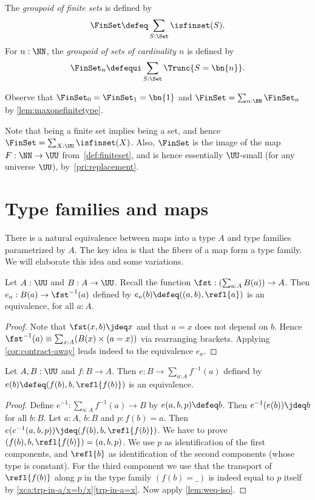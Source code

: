 \begin{definition}\label{def:groupoidFin}
The \emph{groupoid of finite sets} is defined by
\[
  \FinSet\defeq\sum_{S:\Set}\isfinset(S).
\]
For $n:\NN$, the \emph{groupoid of sets of cardinality $n$} is defined by
\[
  \FinSet_n\defequi \sum_{S:\Set}\Trunc{S=\bn{n}}.\qedhere
\]
\end{definition}
Observe that $\FinSet_0=\FinSet_1=\bn{1} $ and $\FinSet=\sum_{n:\NN}\FinSet_n$
by \cref{lem:maxonefinitetype}.

Note that being a finite set implies being a set, and hence
$\FinSet = \sum_{X:\UU}\isfinset(X)$.
Also, $\FinSet$ is the image of the map $F : \NN \to \UU$
from~\cref{def:finiteset}, and is hence essentially $\UU$-small
(for any universe $\UU$), by~\cref{pri:replacement}.


\section{Type families and maps}
\label{sec:typefam}

There is a natural equivalence between maps into a type $A$
and type families parametrized by $A$. The key idea is that the
fibers of a map form a type family. We will elaborate this
idea and some variations.


\begin{lemma}\label{lem:fst-fiber(a)=B(a)}
Let $A:\UU$ and $B:A\to\UU$.
Recall the function $\fst: (\sum_{a:A} B(a))\to A$.
Then $e_a: B(a) \to \fst^{-1}(a)$ defined by
$e_a(b)\defeq ((a,b),\refl{a})$ is an equivalence,
for all $a:A$.
\end{lemma}
\begin{proof}
Note that $\fst(x,b)\jdeq x$ and that $a=x$ does
not depend on $b$. Hence
$\fst^{-1}(a) \equiv \sum_{x:A}  (B(x) \times (a=x))$
via rearranging brackets.
Applying \cref{cor:contract-away} leads indeed to
the equivalence $e_a$.
\end{proof}

\begin{lemma}\label{lem:sum-of-fibers}
Let $A,B:\UU$ and $f:B\to A$.
Then $e: B \to \sum_{a:A} f^{-1}(a)$ defined by
$e(b)\defeq (f(b),b,\refl{f(b)})$ is an equivalence.
\end{lemma}
\begin{proof}
Define $e^{-1}: \sum_{a:A} f^{-1}(a) \to B$ by $e(a,b,p)\defeq b$.
Then $e^{-1}(e(b))\jdeq b$ for all $b:B$.
Let $a:A$, $b:B$ and $p: f(b)=a$.
Then $e(e^{-1}(a,b,p))\jdeq (f(b),b,\refl{f(b)})$.
We have to prove $(f(b),b,\refl{f(b)})=(a,b,p)$.
We use $p$ as identification of the first components,
and $\refl{b}$ as identification of the second components
(whose type is constant). For the third component
we use that the transport of $\refl{f(b)}$ along $p$
in the type family $(f(b)=\_)$ is indeed equal to $p$
itself by \cref{xca:trp-in-a/x=b/x}\ref{trp-in-a=x}.
Now apply \cref{lem:weq-iso}.
\end{proof}

